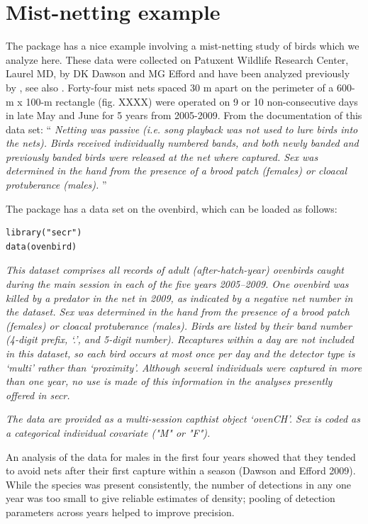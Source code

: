 \section{Mist-netting example}

The package \secr has a nice example involving a mist-netting study of
birds which we analyze here. These data were collected on
Patuxent Wildlife Research Center, Laurel MD, 
by DK Dawson and MG Efford and have been analyzed previously 
by \citet{efford_etal:2004}, see also \citet{borchers_efford:2008}.
Forty-four mist nets spaced 30 m apart on the
perimeter of a 600-m x 100-m rectangle (fig. XXXX)  were operated
on 9 or 10 non-consecutive days in late May and June for 5 years from 2005-2009.
From the \secr documentation of this data set:
``{\it
Netting was passive (i.e. song playback was not used to lure birds
into the nets). Birds received individually numbered bands, and both
newly banded and previously banded birds were released at the net
where captured. Sex was determined in the hand from the presence of a
brood patch (females) or cloacal protuberance (males).
}''

The \secr package has a data set on the ovenbird, which can be loaded
as follows:
\begin{verbatim}
library("secr")
data(ovenbird)
\end{verbatim}
{\it This dataset comprises all records of adult (after-hatch-year) ovenbirds caught during the main session in each of the five years 2005–2009. One ovenbird was killed by a predator in the net in 2009, as indicated by a negative net number in the dataset. Sex was determined in the hand from the presence of a brood patch (females) or cloacal protuberance (males). Birds are listed by their band number (4-digit prefix, ‘.’, and 5-digit number). Recaptures within a day are not included in this dataset, so each bird occurs at most once per day and the detector type is ‘multi’ rather than ‘proximity’. Although several individuals were captured in more than one year, no use is made of this information in the analyses presently offered in secr. }

{\it The data are provided as a multi-session capthist object ‘ovenCH’. Sex is coded as a categorical individual covariate ("M" or "F").

An analysis of the data for males in the first four years showed that they tended to avoid nets after their first capture within a season (Dawson and Efford 2009). While the species was present consistently, the number of detections in any one year was too small to give reliable estimates of density; pooling of detection parameters across years helped to improve precision.
}



